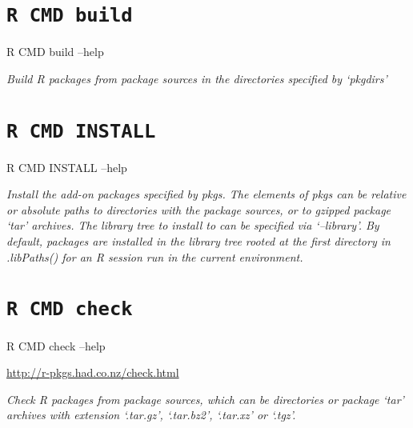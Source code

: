 \documentclass[]{book}
\newenvironment{Shaded}{\begin{snugshade}}{\end{snugshade}}
\newcommand{\NormalTok}[1]{{#1}}
\theoremstyle{definition}
\theoremstyle{definition}
\theoremstyle{definition}
\theoremstyle{remark}
\begin{document}
\section{\texorpdfstring{\texttt{R\ CMD\ build}}{R CMD build}}\label{r-cmd-build}

\begin{Shaded}
\begin{Highlighting}[]
\NormalTok{R CMD build --help}
\end{Highlighting}
\end{Shaded}

\emph{Build R packages from package sources in the directories specified
by `pkgdirs'}

\section{\texorpdfstring{\texttt{R\ CMD\ INSTALL}}{R CMD INSTALL}}\label{r-cmd-install}

\begin{Shaded}
\begin{Highlighting}[]
\NormalTok{R CMD INSTALL --help}
\end{Highlighting}
\end{Shaded}

\emph{Install the add-on packages specified by pkgs. The elements of
pkgs can be relative or absolute paths to directories with the package
sources, or to gzipped package `tar' archives. The library tree to
install to can be specified via `--library'. By default, packages are
installed in the library tree rooted at the first directory in
.libPaths() for an R session run in the current environment.}

\section{\texorpdfstring{\texttt{R\ CMD\ check}}{R CMD check}}\label{r-cmd-check}

\begin{Shaded}
\begin{Highlighting}[]
\NormalTok{R CMD check --help}
\end{Highlighting}
\end{Shaded}

\url{http://r-pkgs.had.co.nz/check.html}

\emph{Check R packages from package sources, which can be directories or
package `tar' archives with extension `.tar.gz', `.tar.bz2', `.tar.xz'
or `.tgz'.}
\end{document}
